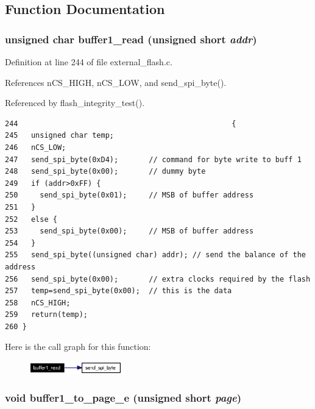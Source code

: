 \subsection{Function Documentation}
\subsubsection{\setlength{\rightskip}{0pt plus 5cm}unsigned char buffer1\_\-read (unsigned short {\em addr})}\label{external__flash_8c_a9}




Definition at line 244 of file external\_\-flash.c.

References n\-CS\_\-HIGH, n\-CS\_\-LOW, and send\_\-spi\_\-byte().

Referenced by flash\_\-integrity\_\-test().

\footnotesize\begin{verbatim}244                                                 {
245   unsigned char temp;
246   nCS_LOW;
247   send_spi_byte(0xD4);       // command for byte write to buff 1
248   send_spi_byte(0x00);       // dummy byte
249   if (addr>0xFF) {
250     send_spi_byte(0x01);     // MSB of buffer address
251   }
252   else {
253     send_spi_byte(0x00);     // MSB of buffer address
254   }  
255   send_spi_byte((unsigned char) addr); // send the balance of the address
256   send_spi_byte(0x00);       // extra clocks required by the flash
257   temp=send_spi_byte(0x00);  // this is the data 
258   nCS_HIGH; 
259   return(temp);
260 }
\end{verbatim}\normalsize 




Here is the call graph for this function:\begin{figure}[H]
\begin{center}
\leavevmode
\includegraphics[width=114pt]{external__flash_8c_a9_cgraph}
\end{center}
\end{figure}
\subsubsection{\setlength{\rightskip}{0pt plus 5cm}void buffer1\_\-to\_\-page\_\-e (unsigned short {\em page})}\label{external__flash_8c_a4}




